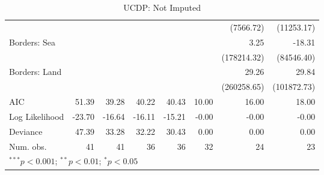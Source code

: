 \begin{table}
\begin{center}
{\begin{tabular}{l D{.}{.}{3.3} D{.}{.}{3.4} D{.}{.}{3.4} D{.}{.}{3.4} D{.}{.}{8.3} D{.}{.}{9.3} D{.}{.}{9.3}}
                        &        &            &            &            &              & (7566.72)     & (11253.17)    \\
Borders: Sea            &        &            &            &            &              & 3.25          & -18.31        \\
                        &        &            &            &            &              & (178214.32)   & (84546.40)    \\
Borders: Land           &        &            &            &            &              & 29.26         & 29.84         \\
                        &        &            &            &            &              & (260258.65)   & (101872.73)   \\
\midrule
AIC                     & 51.39  & 39.28      & 40.22      & 40.43      & 10.00        & 16.00         & 18.00         \\
Log Likelihood          & -23.70 & -16.64     & -16.11     & -15.21     & -0.00        & -0.00         & -0.00         \\
Deviance                & 47.39  & 33.28      & 32.22      & 30.43      & 0.00         & 0.00          & 0.00          \\
Num. obs.               & 41     & 41         & 36         & 36         & 32           & 24            & 23            \\
\bottomrule
{}
\end{tabular}
}
\caption{UCDP: Not Imputed}
\label{UCDP_NI}
\end{center}
\end{table}

